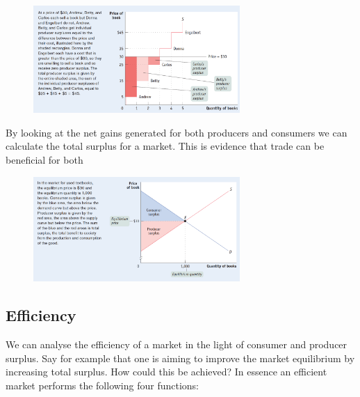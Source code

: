 \documentclass[english,course]{Notes}
\begin{document}

\begin{figure}[ht]
\centering
\includegraphics[width=0.7\textwidth]{producerSurplus}
\end{figure}


\par{By looking at the net gains generated for both producers and consumers we can calculate the total surplus for a market. This is evidence that trade can be beneficial for both}


\begin{figure}[ht]
\centering
\includegraphics[width=0.7\textwidth]{CPsurplus}
\end{figure}




\subsection{Efficiency}


\par{We can analyse the efficiency of a market in the light of consumer and producer surplus. Say for example that one is aiming to improve the market equilibrium by increasing total surplus. How could this be achieved? In essence an efficient market performs the following four functions:}
\end{document}
